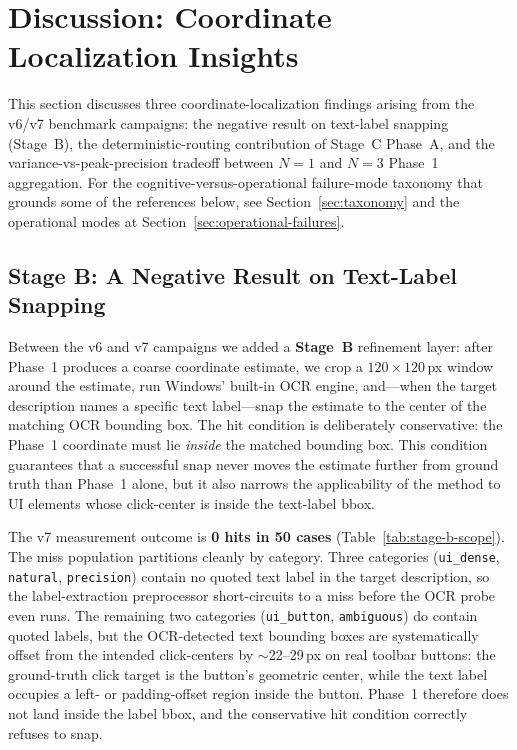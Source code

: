 \section{Discussion: Coordinate Localization Insights}
\label{sec:discussion}

This section discusses three coordinate-localization findings
arising from the v6/v7 benchmark campaigns: the negative result on
text-label snapping (Stage~B), the deterministic-routing
contribution of Stage~C Phase~A, and the variance-vs-peak-precision
tradeoff between $N{=}1$ and $N{=}3$ Phase~1 aggregation.  For the
cognitive-versus-operational failure-mode taxonomy that grounds
some of the references below, see Section~\ref{sec:taxonomy} and
the operational modes at Section~\ref{sec:operational-failures}.

\subsection{Stage B: A Negative Result on Text-Label Snapping}
\label{sec:discussion-stage-b}

Between the v6 and v7 campaigns we added a \textbf{Stage~B}
refinement layer: after Phase~1 produces a coarse coordinate
estimate, we crop a $120 \times 120$\,px window around the
estimate, run Windows' built-in OCR engine, and---when the target
description names a specific text label---snap the estimate to the
center of the matching OCR bounding box.  The hit condition is
deliberately conservative: the Phase~1 coordinate must lie
\emph{inside} the matched bounding box.  This condition guarantees
that a successful snap never moves the estimate further from
ground truth than Phase~1 alone, but it also narrows the
applicability of the method to UI elements whose click-center is
inside the text-label bbox.

The v7 measurement outcome is \textbf{0 hits in 50 cases}
(Table~\ref{tab:stage-b-scope}).  The miss population partitions
cleanly by category.  Three categories (\texttt{ui\_dense},
\texttt{natural}, \texttt{precision}) contain no quoted text label
in the target description, so the label-extraction preprocessor
short-circuits to a miss before the OCR probe even runs.  The
remaining two categories (\texttt{ui\_button}, \texttt{ambiguous})
do contain quoted labels, but the OCR-detected text bounding
boxes are systematically offset from the intended click-centers by
$\sim$22--29\,px on real toolbar buttons: the ground-truth click
target is the button's geometric center, while the text label
occupies a left- or padding-offset region inside the button.
Phase~1 therefore does not land inside the label bbox, and the
conservative hit condition correctly refuses to snap.

